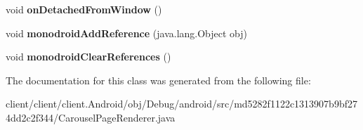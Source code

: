 \begin{DoxyCompactItemize}
\item 
\hypertarget{classmd5282f1122c1313907b9bf274dd2c2f344_1_1CarouselPageRenderer_a4a8e5ff797cf8f263c3ceabc30472ec5}{}void {\bfseries on\+Detached\+From\+Window} ()\label{classmd5282f1122c1313907b9bf274dd2c2f344_1_1CarouselPageRenderer_a4a8e5ff797cf8f263c3ceabc30472ec5}

\item 
\hypertarget{classmd5282f1122c1313907b9bf274dd2c2f344_1_1CarouselPageRenderer_a898690bb58327956fee119bdf01df171}{}void {\bfseries monodroid\+Add\+Reference} (java.\+lang.\+Object obj)\label{classmd5282f1122c1313907b9bf274dd2c2f344_1_1CarouselPageRenderer_a898690bb58327956fee119bdf01df171}

\item 
\hypertarget{classmd5282f1122c1313907b9bf274dd2c2f344_1_1CarouselPageRenderer_ad5bf3c93ab72f947e73de1ce86c1be3e}{}void {\bfseries monodroid\+Clear\+References} ()\label{classmd5282f1122c1313907b9bf274dd2c2f344_1_1CarouselPageRenderer_ad5bf3c93ab72f947e73de1ce86c1be3e}

\end{DoxyCompactItemize}


The documentation for this class was generated from the following file\+:\begin{DoxyCompactItemize}
\item 
client/client/client.\+Android/obj/\+Debug/android/src/md5282f1122c1313907b9bf274dd2c2f344/Carousel\+Page\+Renderer.\+java\end{DoxyCompactItemize}

